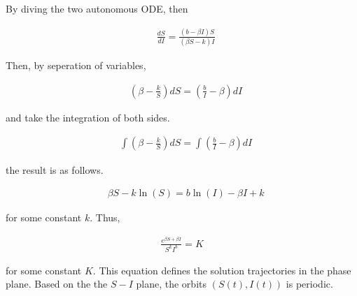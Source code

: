 \documentclass[../main.tex]{subfiles}
\begin{document}
    \begin{flushleft}
        By diving the two autonomous ODE, then
        
        \begin{align*}
            & \frac{dS}{dI} = \frac{(b - \beta I)S}{(\beta S - k)I}
        \end{align*}
        
        Then, by seperation of variables,
        
        \begin{align*}
            & \left(\beta - \frac{k}{S}\right)dS = \left(\frac{b}{I} - \beta\right) dI
        \end{align*}
        
        and take the integration of both sides.
        
        \begin{align*}
            & \int \left(\beta - \frac{k}{S}\right)dS = \int \left(\frac{b}{I} - \beta\right) dI
        \end{align*}
        
        the result is as follows.
        
        \begin{align*}
            & \beta S - k \ln(S) = b \ln(I) - \beta I + k
        \end{align*}
        
        for some constant $k$. Thus,
        
        \begin{align*}
            \frac{e^{\beta S + \beta I}}{S^kI^b} = K
        \end{align*}
        
        for some constant $K$. This equation defines the solution trajectories in the phase plane. Based on the the $S-I$ plane, the orbits $(S(t), I(t))$ is periodic.
        
    \end{flushleft}
\end{document}

